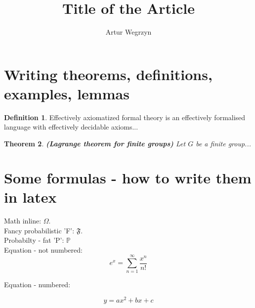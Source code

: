 \documentclass[12pt]{article}
\theoremstyle{plain}
\newtheorem{thm}{Theorem} %
\theoremstyle{definition}
\newtheorem{defn}[thm]{Definition}
\begin{document}
\title{Title of the Article}
\author{Artur Wegrzyn}
\maketitle

\tableofcontents

\section{Writing theorems, definitions, examples, lemmas}
\begin{defn}
Effectively axiomatized formal theory is an effectively formalised language with 
effectively decidable axioms...
\end{defn}

\begin{thm}
\textbf{(Lagrange theorem for finite groups)} Let $G$ be a finite group...
\end{thm}


\section{Some formulas - how to write them in latex}
Math inline: $\Omega$. \\
Fancy probabilistic 'F': $\mathfrak{F}$. \\
Probabilty - fat 'P': $\mathbb{P}$ \\ 
Equation - not numbered:
\begin{equation*}
e^x = \sum_{n=1}^{\infty}\frac{x^n}{n!}
\end{equation*}

Equation - numbered:

\begin{equation}
y = ax^2 + bx + c
\end{equation}
\end{document}
